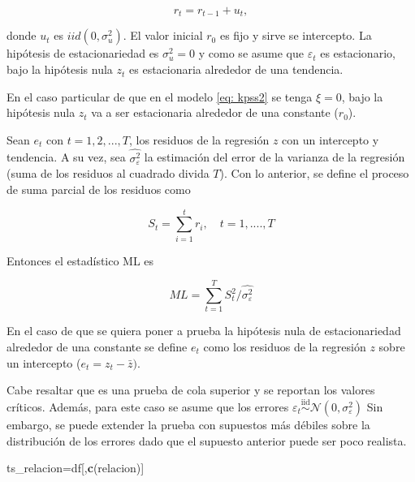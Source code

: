 \documentclass[
  oneside]{article}
\newenvironment{Shaded}{\begin{snugshade}}{\end{snugshade}}
\newcommand{\FunctionTok}[1]{\textcolor[rgb]{0.13,0.29,0.53}{\textbf{#1}}}
\newcommand{\NormalTok}[1]{#1}
\newcommand{\OtherTok}[1]{\textcolor[rgb]{0.56,0.35,0.01}{#1}}
\newcommand{\StringTok}[1]{\textcolor[rgb]{0.31,0.60,0.02}{#1}}
\begin{document}
\begin{equation}
    \label{eq: kpss3}    
    r_t = r_{t-1} + u_t,
\end{equation}

donde \(u_t\) es \(iid(0,\sigma_u^2)\). El valor inicial \(r_0\) es fijo
y sirve se intercepto. La hipótesis de estacionariedad es
\(\sigma_u^2=0\) y como se asume que \(\varepsilon_t\) es estacionario,
bajo la hipótesis nula \(z_t\) es estacionaria alrededor de una
tendencia.

En el caso particular de que en el modelo \eqref{eq: kpss2} se tenga
\(\xi=0\), bajo la hipótesis nula \(z_t\) va a ser estacionaria
alrededor de una constante (\(r_0\)).

Sean \(e_t\) con \(t=1,2,...,T\), los residuos de la regresión \(z\) con
un intercepto y tendencia. A su vez, sea \(\hat{\sigma_\varepsilon^2}\)
la estimación del error de la varianza de la regresión (suma de los
residuos al cuadrado divida \(T\)). Con lo anterior, se define el
proceso de suma parcial de los residuos como

\begin{equation}
    \label{eq: kpss5}
    S_t=\sum_{i=1}^t r_i, \quad t=1,....,T   
\end{equation}

Entonces el estadístico ML es

\begin{equation}
    \label{eq: kpss6}
    ML=\sum_{t=1}^T S^2_t/\hat{\sigma^2_\varepsilon}   
\end{equation}

En el caso de que se quiera poner a prueba la hipótesis nula de
estacionariedad alrededor de una constante se define \(e_t\) como los
residuos de la regresión \(z\) sobre un intercepto
(\(e_t=z_t-\bar{z})\).

Cabe resaltar que es una prueba de cola superior y se reportan los
valores críticos. Además, para este caso se asume que los errores
\(\varepsilon_t \overset{\text{iid}}{\sim} \mathcal{N}(0,\sigma_{\varepsilon}^2)\)
Sin embargo, se puede extender la prueba con supuestos más débiles sobre
la distribución de los errores dado que el supuesto anterior puede ser
poco realista.

\begin{Shaded}
\begin{Highlighting}[]
\NormalTok{ts\_relacion}\OtherTok{=}\NormalTok{df[,}\FunctionTok{c}\NormalTok{(}\StringTok{\textquotesingle{}relacion\textquotesingle{}}\NormalTok{)]}
\end{Highlighting}
\end{Shaded}
\end{document}
